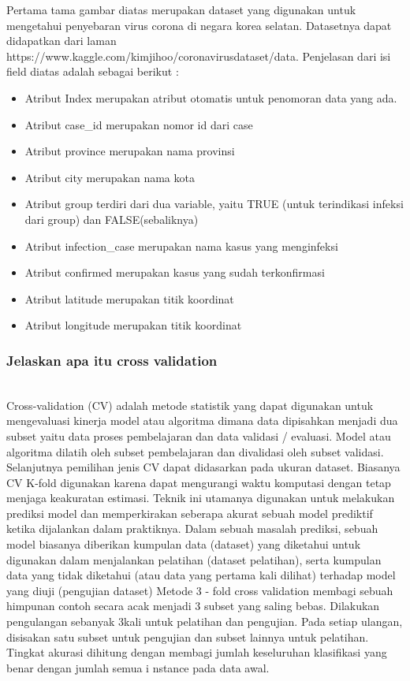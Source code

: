 \begin{enumerate}
\begin{itemize}
	Pertama tama gambar diatas merupakan dataset yang digunakan untuk mengetahui penyebaran virus corona di negara korea selatan. Datasetnya dapat didapatkan dari laman https://www.kaggle.com/kimjihoo/coronavirusdataset/data. Penjelasan dari isi ﬁeld diatas adalah sebagai berikut :
	\begin{itemize}
	\item Atribut Index merupakan atribut otomatis untuk penomoran data yang ada. 
	\item Atribut case\_id merupakan nomor id dari case
	\item Atribut province merupakan nama provinsi
	\item Atribut city merupakan nama kota
	\item Atribut group terdiri dari dua variable, yaitu TRUE (untuk terindikasi infeksi dari group) dan FALSE(sebaliknya)
	\item Atribut infection\_case merupakan nama kasus yang menginfeksi
	\item Atribut confirmed merupakan kasus yang sudah terkonfirmasi
	\item Atribut latitude merupakan titik koordinat
	\item Atribut longitude merupakan titik koordinat
	\end{itemize}
	\end{itemize}
\end{enumerate}

\subsubsection{ Jelaskan apa itu cross validation}
\hfill\\
Cross-validation (CV) adalah metode statistik yang dapat digunakan untuk mengevaluasi kinerja model atau algoritma dimana data dipisahkan menjadi dua subset yaitu data proses pembelajaran dan data validasi / evaluasi. Model atau algoritma dilatih oleh subset pembelajaran dan divalidasi oleh subset validasi. Selanjutnya pemilihan jenis CV dapat didasarkan pada ukuran dataset. Biasanya CV K-fold digunakan karena dapat mengurangi waktu komputasi dengan tetap menjaga keakuratan estimasi.
	Teknik ini utamanya digunakan untuk melakukan prediksi model dan memperkirakan seberapa akurat sebuah model prediktif ketika dijalankan dalam praktiknya. Dalam sebuah masalah prediksi, sebuah model biasanya diberikan kumpulan data (dataset) yang diketahui untuk digunakan dalam menjalankan pelatihan (dataset pelatihan), serta kumpulan data yang tidak diketahui (atau data yang pertama kali dilihat)  terhadap model yang diuji (pengujian dataset) Metode 3 - fold cross validation membagi sebuah himpunan contoh  secara  acak  menjadi  3  subset yang saling bebas. Dilakukan pengulangan sebanyak 3kali untuk pelatihan dan pengujian. Pada setiap ulangan, disisakan satu subset untuk pengujian dan subset lainnya untuk pelatihan. Tingkat akurasi dihitung dengan membagi jumlah keseluruhan klasifikasi  yang benar dengan jumlah  semua  i nstance pada data  awal.

